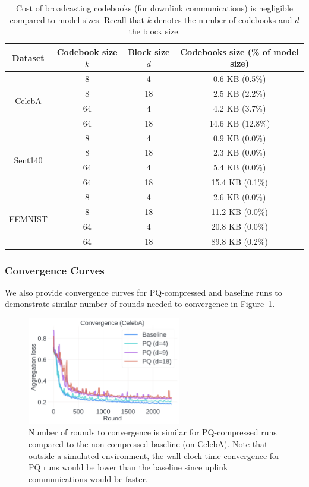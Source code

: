 \begin{table}[t]
     \caption{Cost of broadcasting codebooks (for downlink communications) is negligible compared to model sizes. Recall that $k$ denotes the number of codebooks and $d$ the block size.}
    \centering
    \vspace{3pt}
    \begin{tabular}{c|ccc}
    \toprule
    Dataset & Codebook size $k$ & Block size $d$ & Codebooks size (\% of model size) \\
    \midrule
    \multirow{4}{*}{CelebA} & 8 & 4 & 0.6 KB (0.5\%) \\
    & 8 & 18 & 2.5 KB (2.2\%) \\
    & 64 & 4 & 4.2 KB (3.7\%) \\
    & 64 & 18 & 14.6 KB (12.8\%) \\
    \midrule
    \multirow{4}{*}{Sent140} & 8 & 4 & 0.9 KB (0.0\%) \\
    & 8 & 18 & 2.3 KB (0.0\%) \\
    & 64 & 4 & 5.4 KB (0.0\%) \\
    & 64 & 18 & 15.4 KB (0.1\%) \\
    \midrule
    \multirow{4}{*}{FEMNIST} & 8 & 4 & 2.6 KB (0.0\%) \\
    & 8 & 18 & 11.2 KB (0.0\%) \\
    & 64 & 4 & 20.8 KB (0.0\%) \\
    & 64 & 18 & 89.8 KB (0.2\%) \\
    \bottomrule
    \end{tabular}
    \label{tab:codebook_size}
\end{table}

\subsubsection{Convergence Curves}
\label{appendix:convergence}
We also provide convergence curves for PQ-compressed and baseline runs to demonstrate similar number of rounds needed to convergence in Figure~\ref{fig:loss}.

\begin{figure}[t]
    \centering
    \includegraphics[width=0.6\textwidth]{submissions/GrahamCormode/figs/loss.pdf}
    \caption{\label{fig:loss}
    Number of rounds to convergence is similar for PQ-compressed runs compared to the non-compressed baseline (on CelebA).
    Note that outside a simulated environment, the wall-clock time convergence for PQ runs would be lower than the baseline since uplink communications would be faster.}
\end{figure}

